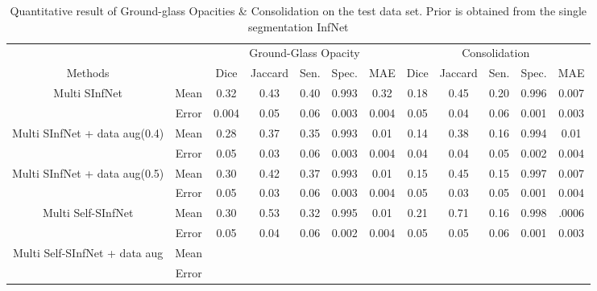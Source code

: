 \begin{table}[!h]
	\centering
	\begin{tabular}{| c | c || c c c c c || c c c c c |}
		\hline
		& &\multicolumn{5}{c||}{Ground-Glass Opacity} & \multicolumn{5}{c|}{Consolidation}\\ \cline{3-12}
		Methods & & Dice & Jaccard & Sen. & Spec. & MAE & Dice & Jaccard & Sen. & Spec. & MAE \\\hline
		Multi SInfNet & Mean & 0.32 & 0.43 & 0.40 & 0.993 & 0.32 & 0.18 & 0.45  & 0.20 & 0.996 & 0.007  \\ \cline{2-12}
		& Error & 0.004 & 0.05 & 0.06 & 0.003 & 0.004 & 0.05 & 0.04 & 0.06 & 0.001 & 0.003 \\ \hline \hline
		
		Multi SInfNet + data aug(0.4) & Mean & 0.28 & 0.37 & 0.35 & 0.993 & 0.01 & 0.14 & 0.38 & 0.16 & 0.994 & 0.01  \\ \cline{2-12}
		& Error & 0.05 & 0.03 & 0.06 & 0.003 & 0.004 & 0.04 & 0.04 & 0.05 & 0.002 & 0.004  \\ \hline \hline
		
		Multi SInfNet + data aug(0.5) & Mean & 0.30 & 0.42 & 0.37 & 0.993 & 0.01 & 0.15 & 0.45 & 0.15 & 0.997 & 0.007  \\ \cline{2-12}
		& Error & 0.05 & 0.03 & 0.06 & 0.003 & 0.004 & 0.05 & 0.03 & 0.05 & 0.001 & 0.004  \\ \hline \hline
		
		Multi Self-SInfNet & Mean & 0.30 & 0.53 & 0.32 & 0.995 & 0.01 & 0.21 & 0.71 & 0.16 & 0.998 & .0006  \\ \cline{2-12}
		& Error & 0.05 & 0.04 & 0.06 & 0.002 & 0.004 & 0.05 & 0.05 & 0.06 & 0.001 & 0.003  \\ \hline \hline
		
		Multi Self-SInfNet + data aug & Mean & & & & & & & & & &  \\ \cline{2-12}
		& Error & & & & & & & & & &  \\ \hline \hline
	\end{tabular}
	\caption{Quantitative result of Ground-glass Opacities \& Consolidation on the test data set. Prior is obtained from the single segmentation InfNet}
	\label{tab:multi-weakprior}
\end{table}


